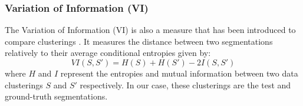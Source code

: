 \subsubsection{Variation of Information (VI)}
The Variation of Information (VI) is also a measure that has been introduced to compare clusterings \citep{Meila:LTKM:2003}. It measures the distance between two segmentations relatively to their average conditional entropies given by:
\begin{equation}
	VI(S, S') = H(S) + H(S') - 2I(S, S')
\end{equation}
where $H$ and $I$ represent the entropies and mutual information between two data clusterings $S$ and $S'$ respectively. In our case, these clusterings are the test and ground-truth segmentations.

\begin{table}[!ht]
\end{table}
